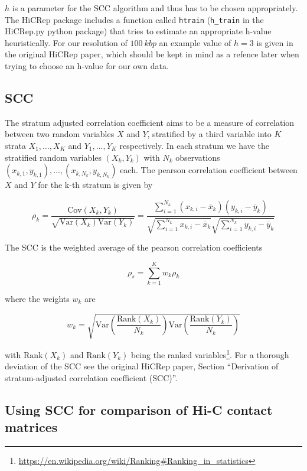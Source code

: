 \documentclass[10pt,abstract=true,titlepage=false,toc=bib]{scrartcl}
\begin{document}
\(h\) is a parameter for the SCC algorithm and thus has to be chosen appropriately. The HiCRep package includes a function called \verb|htrain| (\verb|h_train| in the HiCRep.py python package) that tries to estimate an appropriate h-value heuristically. For our resolution of \(\SI{100}{kbp}\) an example value of \( h = 3 \) is given in the original HiCRep paper, which should be kept in mind as a refence later when trying to choose an h-value for our own data.


\subsection{SCC} %
\label{subsec:scc}

The stratum adjusted correlation coefficient aims to be a measure of correlation between two random variables \(X\) and \(Y\), stratified by a third variable into \(K\) strata \(X_1, \dots, X_K\) and \(Y_1, \dots, Y_K\) respectively. In each stratum we have the stratified random variables \((X_k, Y_k)\) with \(N_k\) observations \( (x_{k,1}, y_{k,1}), \dots, (x_{k,N_k}, y_{k,N_k}) \) each. The pearson correlation coefficient between \(X\) and \(Y\) for the k-th stratum is given by

\[
	\rho_k = \frac{ \mathrm{Cov}(X_k,Y_k) }{ \sqrt{ \mathrm{Var}(X_k) \mathrm{Var}(Y_k)} } = \frac{ \sum_{i=1}^{N_k} (x_{k,i} - \overbar{x}_k) (y_{k,i} - \overbar{y}_k) }{ \sqrt{ \sum_{i=1}^{N_k} x_{k,i} - \overbar{x}_k } \sqrt{ \sum_{i=1}^{N_k} y_{k,i} - \overbar{y}_k } }
\]

The SCC is the weighted average of the pearson correlation coefficients

\[
	\rho_s = \sum_{k=1}^{K} w_k \rho_k
\]

where the weights \(w_k\) are

\[
	w_k = \sqrt{ \mathrm{Var}\left( \frac{ \mathrm{Rank}(X_k) }{ N_k } \right) \mathrm{Var}\left( \frac{ \mathrm{Rank}(Y_k) }{ N_k } \right) }
\]

with \( \mathrm{Rank}(X_k) \) and \( \mathrm{Rank}(Y_k) \) being the ranked variables\footnote{\url{https://en.wikipedia.org/wiki/Ranking\#Ranking_in_statistics}}. For a thorough deviation of the SCC see the original HiCRep paper\cite{yang_hicrep_2017}, Section \enquote{Derivation of stratum-adjusted correlation coefficient (SCC)}.


\subsection{Using SCC for comparison of Hi-C contact matrices} %
\label{subsec:scc_for_comparison_of_hi_c_contact_matrices}
\end{document}
